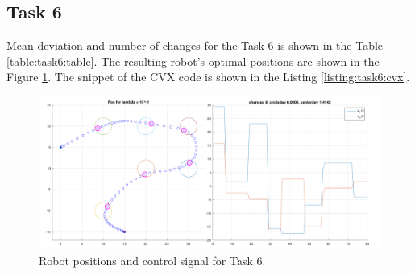 \clearpage
\subsection{Task 6}


Mean deviation and number of changes for the Task 6 is shown in the Table \ref{table:task6:table}. The resulting robot's optimal positions are shown in the Figure \ref{fig:task6:figure}. The snippet of the CVX code is shown in the Listing \ref{listing:task6:cvx}.

\begin{figure}[!htb]
    \centering    
    \includegraphics[width=1\linewidth]{part1/figures/task_6.pdf}
    \caption{Robot positions and control signal for Task 6.}
    \label{fig:task6:figure}
\end{figure}


